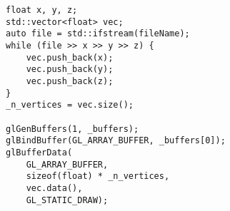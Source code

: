 \begin{lstlisting}
float x, y, z;
std::vector<float> vec;
auto file = std::ifstream(fileName);
while (file >> x >> y >> z) {
    vec.push_back(x);
    vec.push_back(y);
    vec.push_back(z);
}
_n_vertices = vec.size();

glGenBuffers(1, _buffers);
glBindBuffer(GL_ARRAY_BUFFER, _buffers[0]);
glBufferData(
    GL_ARRAY_BUFFER,
    sizeof(float) * _n_vertices,
    vec.data(),
    GL_STATIC_DRAW);
\end{lstlisting}
